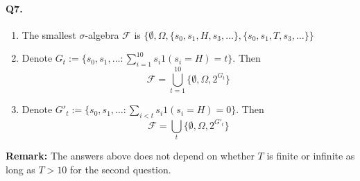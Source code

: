 \documentclass[11pt]{article}
\theoremstyle{definition}
\theoremstyle{boldtitle} %
\numberwithin{equation}{section}
\numberwithin{figure}{section}
\numberwithin{table}{section}
\begin{document}
\paragraph{Q7.}
\begin{enumerate}
    \item The smallest $\sigma$-algebra $\mathcal{F}$ is $\{\emptyset, \Omega, \{s_0, s_1, H, s_3, \dots \}, \{s_0, s_1, T, s_3, \dots \} \}$
    \item Denote $G_t := \{s_0, s_1, \dots : \sum_{i=1}^{10} s_i 1(s_i = H) = t\}$. Then 
    \[
        \mathcal{F} = \bigcup_{t=1}^{10} \{\emptyset, \Omega, 2^{G_t} \}
    \]
    \item Denote $G'_t := \{s_0, s_1, \dots : \sum_{i < t} s_i 1(s_i = H) = 0 \}$. Then 
    \[
        \mathcal{F} = \bigcup_{t} \{\emptyset, \Omega, 2^{G'_t} \}
    \]
\end{enumerate}

\textbf{Remark:} The answers above does not depend on whether $T$ is finite or infinite as long as $T > 10$ for the second question.
\end{document}
